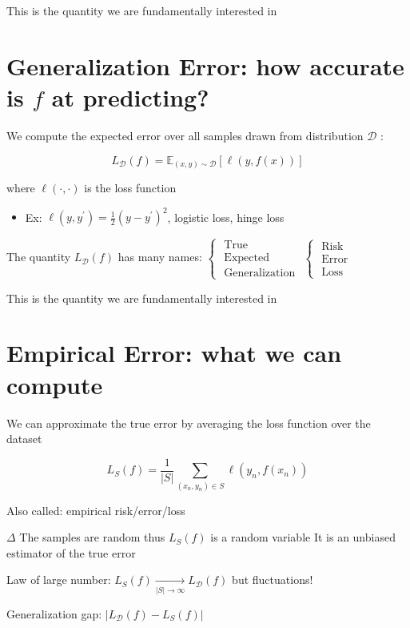 \documentclass[10pt]{article}
\begin{document}
This is the quantity we are fundamentally interested in

\section*{Generalization Error: how accurate is $f$ at predicting?}
We compute the expected error over all samples drawn from distribution $\mathscr{D}$ :

$$
L_{\mathscr{D}}(f)=\mathbb{E}_{(x, y) \sim \mathscr{D}}[\ell(y, f(x))]
$$

where $\ell(\cdot, \cdot)$ is the loss function

\begin{itemize}
  \item Ex: $\ell\left(y, y^{\prime}\right)=\frac{1}{2}\left(y-y^{\prime}\right)^{2}$, logistic loss, hinge loss
\end{itemize}

The quantity $L_{\mathscr{D}}(f)$ has many names: $\left\{\begin{array}{l}\text { True } \\ \text { Expected } \\ \text { Generalization }\end{array}\left\{\begin{array}{l}\text { Risk } \\ \text { Error } \\ \text { Loss }\end{array}\right.\right.$

This is the quantity we are fundamentally interested in

\section*{Empirical Error: what we can compute}
We can approximate the true error by averaging the loss function over the dataset

$$
L_{S}(f)=\frac{1}{|S|} \sum_{\left(x_{n}, y_{n}\right) \in S} \ell\left(y_{n}, f\left(x_{n}\right)\right)
$$

Also called: empirical risk/error/loss

$\Delta$ The samples are random thus $L_{S}(f)$ is a random variable It is an unbiased estimator of the true error

Law of large number: $L_{S}(f) \underset{|S| \rightarrow \infty}{\rightarrow} L_{\mathscr{D}}(f)$ but fluctuations!

Generalization gap: $\left|L_{\mathscr{D}}(f)-L_{S}(f)\right|$
\end{document}
